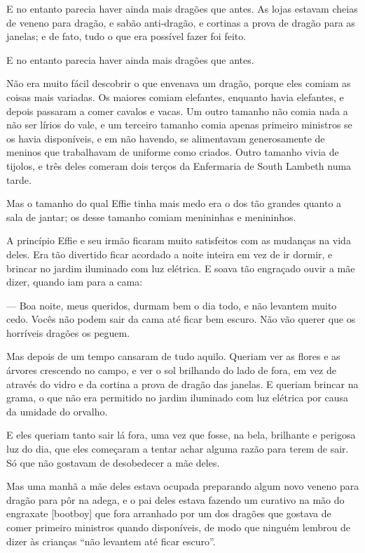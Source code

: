 E no entanto parecia haver ainda mais dragões que antes. As lojas
estavam cheias de veneno para dragão, e sabão anti-dragão, e cortinas
a prova de dragão para as janelas; e de fato, tudo o que era possível
fazer foi feito.

E no entanto parecia haver ainda mais dragões que antes.

Não era muito fácil descobrir o que envenava um dragão, porque eles
comiam as coisas mais variadas. Os maiores comiam elefantes, enquanto
havia elefantes, e depois passaram a comer cavalos e vacas. Um outro
tamanho não comia nada a não ser lírios do vale, e um terceiro
tamanho comia apenas primeiro ministros se os havia disponíveis, e em
não havendo, se alimentavam generosamente de meninos que trabalhavam
de uniforme como criados. Outro tamanho vivia de tijolos, e três
deles comeram dois terços da Enfermaria de South Lambeth numa tarde.

Mas o tamanho do qual Effie tinha mais medo era o dos tão grandes
quanto a sala de jantar; os desse tamanho comiam menininhas e
menininhos.

A princípio Effie e seu irmão ficaram muito satisfeitos com as
mudanças na vida deles. Era tão divertido ficar acordado a noite
inteira em vez de ir dormir, e brincar no jardim iluminado com luz
elétrica. E soava tão engraçado ouvir a mãe dizer, quando iam para a
cama:

— Boa noite, meus queridos, durmam bem o dia todo, e não levantem
muito cedo. Vocês não podem sair da cama até ficar bem escuro. Não
vão querer que os horríveis dragões os peguem.

Mas depois de um tempo cansaram de tudo aquilo. Queriam ver as flores
e as árvores crescendo no campo, e ver o sol brilhando do lado de
fora, em vez de através do vidro e da cortina a prova de dragão das
janelas. E queriam brincar na grama, o que não era permitido no
jardim iluminado com luz elétrica por causa da umidade do orvalho.

E eles queriam tanto sair lá fora, uma vez que fosse, na bela,
brilhante e perigosa luz do dia, que eles começaram a tentar achar
alguma razão para terem de sair. Só que não gostavam de desobedecer a
mãe deles.

Mas uma manhã a mãe deles estava ocupada preparando algum novo veneno
para dragão para pôr na adega, e o pai deles estava fazendo um
curativo na mão do engraxate [bootboy] que fora arranhado por um dos
dragões que gostava de comer primeiro ministros quando disponíveis,
de modo que ninguém lembrou de dizer às crianças “não levantem até
ficar escuro”.

